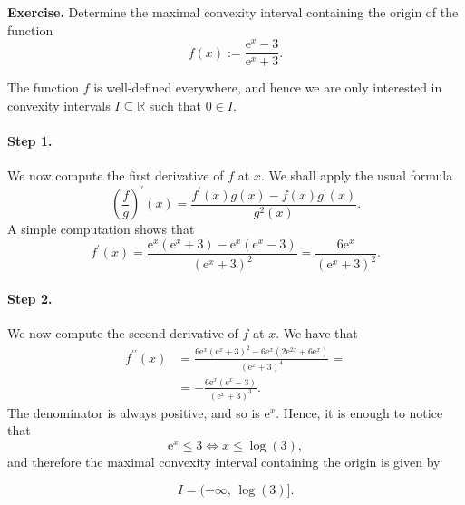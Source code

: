 \documentclass[a4paper,10 pt]{report}
\newcommand{\finalanswer}[1]{%
    \begin{finalAnswer}
    \[
        #1
    \]
    \end{finalAnswer}
}
\theoremstyle{definition}
\newcommand{\R}{\mathbb R}
\begin{document}
\begin{exerciseBox} \textbf{Exercise.} Determine the maximal convexity interval containing the origin of the function
\begin{equation*}f(x) := \frac{\mathrm{e}^x - 3}{\mathrm{e}^x + 3}. \end{equation*}
\end{exerciseBox}

\begin{solutionBox} The function $f$ is well-defined everywhere, and hence we are only interested in convexity intervals $I \subseteq \R$ such that $0 \in I$.

\paragraph{Step 1.} We now compute the first derivative of $f$ at $x$. We shall apply the usual formula
\begin{equation*}\left( \frac{f}{g} \right)^\prime(x) = \frac{f^\prime(x) g(x) - f(x) g^\prime(x)}{g^2(x)}. \end{equation*}A simple computation shows that
\begin{equation*}f^\prime(x) = \frac{\mathrm{e}^x(\mathrm{e}^x + 3) - \mathrm{e}^x(\mathrm{e}^x - 3)}{(\mathrm{e}^x + 3)^2} = \frac{6 \mathrm{e}^x}{(\mathrm{e}^x + 3)^2}. \end{equation*}

\paragraph{Step 2.} We now compute the second derivative of $f$ at $x$. We have that
\begin{equation*}\begin{aligned} f^{\prime\prime}(x) & = \frac{6\mathrm{e}^x(\mathrm{e}^x + 3)^2 - 6 \mathrm{e}^x (2 \mathrm{e}^{2x} + 6 \mathrm{e}^x)}{(\mathrm{e}^x + 3)^4} =
\\[1em] & = - \frac{6\mathrm{e}^x(\mathrm{e}^x - 3)}{(\mathrm{e}^x + 3)^3}. \end{aligned} \end{equation*}
The denominator is always positive, and so is $\mathrm{e}^x$. Hence, it is enough to notice that
\begin{equation*} \mathrm{e}^x \leq 3 \iff x \leq \log(3), \end{equation*}
and therefore the maximal convexity interval containing the origin is given by
\finalanswer{
  I = (- \infty, \, \log(3)].
} 
\end{solutionBox}
\end{document}
